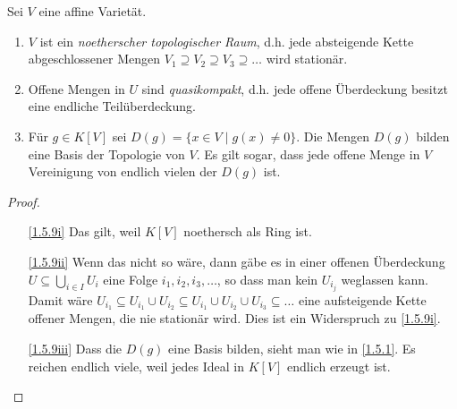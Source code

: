 \documentclass[a4paper,12pt]{scrbook}
\newtheorem{proof}{Beweis}
\begin{document}
\begin{bem}\label{1.5.9}
  Sei $V$ eine affine Varietät.
  \begin{enumerate}
  \item{} $V$ ist ein \emph{noetherscher topologischer Raum}, d.h. jede absteigende Kette abgeschlossener Mengen
    $V_1\supseteq V_2\supseteq V_3\supseteq\dotso$ wird stationär.
  \item{} Offene Mengen in $U$ sind \emph{quasikompakt}, d.h. jede offene Überdeckung besitzt eine endliche
    Teilüberdeckung.
  \item{} Für $g\in K[V]$ sei $D(g)=\{x\in V\mid g(x)\neq0\}$. Die Mengen $D(g)$ bilden eine Basis der Topologie
    von $V$. Es gilt sogar, dass jede offene Menge in $V$ Vereinigung von endlich vielen der $D(g)$ ist.
  \end{enumerate}
\end{bem}
\begin{proof}
  \begin{enumerate}
  \item[\ref{1.5.9i}] Das gilt, weil $K[V]$ noethersch als Ring ist.
  \item[\ref{1.5.9ii}] Wenn das nicht so wäre, dann gäbe es in einer offenen Überdeckung $U\subseteq\bigcup_{i\in I}U_i$ eine
    Folge $i_1,i_2,i_3,\dotsc$, so dass man kein $U_{i_j}$ weglassen kann. Damit wäre $U_{i_1}\subseteq U_{i_1}\cup U_{i_2}
    \subseteq U_{i_1}\cup U_{i_2}\cup U_{i_3}\subseteq \dotso$ eine aufsteigende Kette offener Mengen, die nie stationär
    wird. Dies ist ein Widerspruch zu \ref{1.5.9i}.
  \item[\ref{1.5.9iii}] Dass die $D(g)$ eine Basis bilden, sieht man wie in \cref{1.5.1}. Es reichen endlich viele, weil
    jedes Ideal in $K[V]$ endlich erzeugt ist.
  \end{enumerate}
\end{proof}

\end{document}
